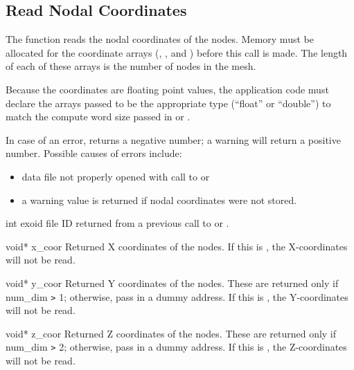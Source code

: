\subsection{Read Nodal Coordinates}




The function  reads the nodal coordinates of the
nodes. Memory must be allocated for the coordinate arrays (,
, and ) before this call is made. The length of each
of these arrays is the number of nodes in the mesh.

Because the coordinates are floating point values, the application
code must declare the arrays passed to be the appropriate type
(``float'' or ``double'') to match the compute word size passed in
 or .


In case of an error,  returns a negative number;
a warning will return a positive number. Possible causes of errors
include:

\begin{itemize}
 \item data file not properly opened with call to 
 or 

 \item a warning value is returned if nodal coordinates were not
 stored.
\end{itemize}


\begin{parameters}
\item[{int exoid \R{}}]
\exo{} file ID returned from a previous call to  
or .

\item[{void* x_coor \W{}}]
Returned X coordinates of the nodes. If this is , the
X-coordinates will not be read.

\item[{void* y_coor \W{}}]
Returned Y coordinates of the nodes. These are returned only if
{num_dim} \texttt{>} 1; otherwise, pass in a dummy address. If this
is , the Y-coordinates will not be read.

\item[{void* z_coor \W{}}]
Returned Z coordinates of the nodes. These are returned only if
{num_dim} \texttt{>} 2; otherwise, pass in a dummy address. If this
is , the Z-coordinates will not be read.
\end{parameters}

